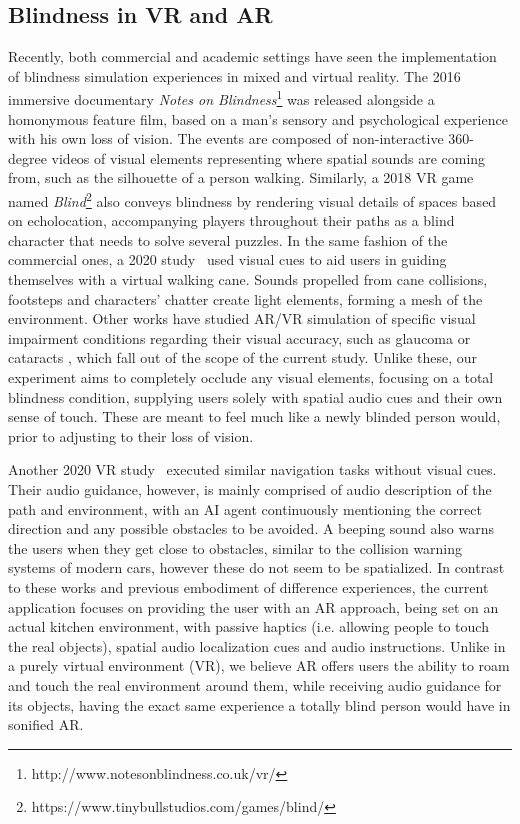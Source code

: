 \documentclass{vgtc}                          %
\begin{document}
\subsection{Blindness in VR and AR}
Recently, both commercial and academic settings have seen the implementation of blindness simulation experiences in mixed and virtual reality. The 2016 immersive documentary \textit{Notes on Blindness}\footnote{http://www.notesonblindness.co.uk/vr/} was released alongside a homonymous feature film, based on a man's sensory and psychological experience with his own loss of vision. The events are composed of non-interactive 360-degree videos of visual elements representing where spatial sounds are coming from, such as the silhouette of a person walking. Similarly, a 2018 VR game named \textit{Blind}\footnote{https://www.tinybullstudios.com/games/blind/} also conveys blindness by rendering visual details of spaces based on echolocation, accompanying  players throughout their paths as a blind character that needs to solve several puzzles. In the same fashion of the commercial ones, a 2020 study~\cite{vrcontest2} used visual cues to aid users in guiding themselves with a virtual walking cane. Sounds propelled from cane collisions, footsteps and characters' chatter create light elements, forming a mesh of the environment. Other works have studied AR/VR simulation of specific visual impairment conditions regarding their visual accuracy, such as glaucoma \cite{jones2020} or cataracts \cite{krosl:2020}, which fall out of the scope of the current study. Unlike these, our experiment aims to completely occlude any visual elements, focusing on a total blindness condition, supplying users solely with spatial audio cues and their own sense of touch. These are meant to feel much like a newly blinded person would, prior to adjusting to their loss of vision. 

Another 2020 VR study~\cite{vrcontest1} executed similar navigation tasks without visual cues. Their audio guidance, however, is mainly comprised of audio description of the path and environment, with an AI agent continuously mentioning the correct direction and any possible obstacles to be avoided. A beeping sound also warns the users when they get close to obstacles, similar to the collision warning systems of modern cars, however these do not seem to be spatialized. In contrast to these works and previous embodiment of difference experiences, the current application focuses on providing the user with an AR approach, being set on an actual kitchen environment, with passive haptics (i.e. allowing people to touch the real objects), spatial audio localization cues and audio instructions. Unlike in a purely virtual environment (VR), we believe AR offers users the ability to roam and touch the real environment around them, while receiving audio guidance for its objects, having the exact same experience a totally blind person would have in sonified AR.
\end{document}
